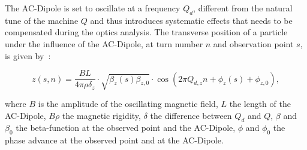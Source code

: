 The AC-Dipole is set to oscillate at a frequency $Q_d$, different from the natural tune of the
machine $Q$ and thus introduces systematic effects that needs to be compensated during the optics
analysis. The transverse position of a particle under the influence of the AC-Dipole, at turn number
$n$ and observation point $s$, is given
by~\cite{serrano_lhc_2010,tomas_normal_2002,white_direct_2013}:

\begin{equation}
z(s, n) = \frac{BL}{4\pi\rho\delta_z} \cdot \sqrt{\beta_z(s) \beta_{z,0}} \cdot \cos \left( 2 \pi Q_{d,z}n + \phi_z(s) + \phi_{z,0}\right),
\label{eq:ac_dipole}
\end{equation}

where $B$ is the amplitude of the oscillating magnetic field, $L$ the length of the AC-Dipole,
$B\rho$ the magnetic rigidity, $\delta$ the difference between $Q_d$ and $Q$, $\beta$ and $\beta_0$
the beta-function at the observed point and the AC-Dipole, $\phi$ and $\phi_0$ the phase advance at
the observed point and at the AC-Dipole.
